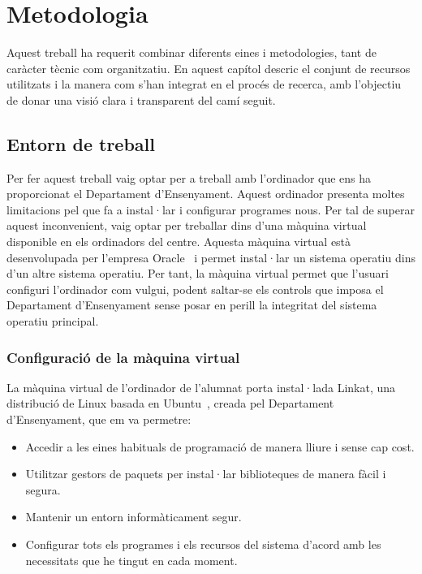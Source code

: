 \chapter{Metodologia}
\label{c:metodologia}

Aquest treball ha requerit combinar diferents eines i metodologies, tant de caràcter tècnic com organitzatiu. En aquest capítol descric el conjunt de recursos utilitzats i la manera com s’han integrat en el procés de recerca, amb l’objectiu de donar una visió clara i transparent del camí seguit.

\section{Entorn de treball}
Per fer aquest treball vaig optar per a treball amb l'ordinador que ens ha proporcionat el Departament d'Ensenyament. Aquest ordinador presenta moltes limitacions pel que fa a instal·lar i configurar programes nous. Per tal de superar aquest inconvenient, vaig optar per treballar dins d'una màquina virtual disponible en els ordinadors del centre. Aquesta màquina virtual està desenvolupada per l'empresa Oracle~\cite{Oracle} i permet instal·lar un sistema operatiu dins d'un altre sistema operatiu. Per tant, la màquina virtual permet que l'usuari configuri l'ordinador com vulgui, podent saltar-se els controls que imposa el Departament d'Ensenyament sense posar en perill la integritat del sistema operatiu principal.

\subsection*{Configuració de la màquina virtual}
La màquina virtual de l'ordinador de l'alumnat porta instal·lada Linkat\cite{Linkat}, una distribució de Linux basada en Ubuntu~\cite{Ubuntu}, creada pel Departament d'Ensenyament, que em va permetre:
\begin{itemize}
  \item Accedir a les eines habituals de programació de manera lliure i sense cap cost.
  \item Utilitzar gestors de paquets per instal·lar biblioteques de manera fàcil i segura.
  \item Mantenir un entorn informàticament segur.
  \item Configurar tots els programes i els recursos del sistema d'acord amb les necessitats que he tingut en cada moment.
\end{itemize}

